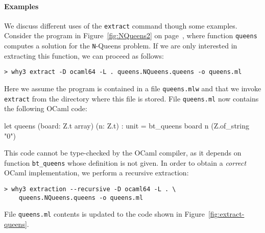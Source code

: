 \paragraph{Examples}
We discuss different uses of the \texttt{extract} command though some examples.
Consider the program in Figure~\ref{fig:NQueens2} on
page~\pageref{fig:NQueens2}, where function \texttt{queens} computes a solution for
the \texttt{N}-Queens problem. If we are only interested in extracting this
function, we can proceed as follows:
\begin{verbatim}
> why3 extract -D ocaml64 -L . queens.NQueens.queens -o queens.ml
\end{verbatim}
Here we assume the program is contained in a file \texttt{queens.mlw} and that
we invoke \texttt{extract} from the directory where this file is stored. File
\texttt{queens.ml} now contains the following OCaml code:
\begin{whycode}
let queens (board: Z.t array) (n: Z.t) : unit =
  bt_queens board n (Z.of_string "0")
\end{whycode}
This code cannot be type-checked by the OCaml compiler, as it depends on
function \texttt{bt\_queens} whose definition is not given. In order to obtain a
\emph{correct} OCaml implementation, we perform a recursive extraction:
\begin{verbatim}
> why3 extraction --recursive -D ocaml64 -L . \
    queens.NQueens.queens -o queens.ml
\end{verbatim}
File \texttt{queens.ml} contents is updated to the code shown in
Figure~\ref{fig:extract-queens}.
